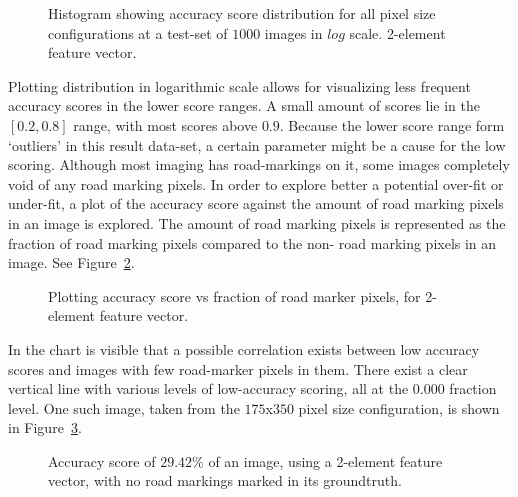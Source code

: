 \begin{figure}[ht]
  \centering
  
  \caption{Histogram showing accuracy score distribution for all pixel size configurations at a test-set of $1000$ images in $log$ scale. 2-element feature vector.
  }\label{fig:xgboost-histogram}
\end{figure}

Plotting distribution in logarithmic scale allows for visualizing less frequent accuracy scores in the lower score ranges. A small amount of scores lie in the $[0.2, 0.8]$ range, with most scores above $0.9$. Because the lower score range form `outliers' in this result data-set, a certain parameter might be a cause for the low scoring. Although most imaging has road-markings on it, some images completely void of any road marking pixels. In order to explore better a potential over-fit or under-fit, a plot of the accuracy score against the amount of road marking pixels in an image is explored. The amount of road marking pixels is represented as the fraction of road marking pixels compared to the non- road marking pixels in an image. See Figure~\ref{fig:xgboost-scatterplot}.

\begin{figure}[ht]
  \centering
  
  \caption{Plotting accuracy score vs fraction of road marker pixels, for 2-element feature vector.
  }\label{fig:xgboost-scatterplot}
\end{figure}

In the chart is visible that a possible correlation exists between low accuracy scores and images with few road-marker pixels in them. There exist a clear vertical line with various levels of low-accuracy scoring, all at the $0.000$ fraction level. One such image, taken from the $175$x$350$ pixel size configuration, is shown in Figure~\ref{fig:xgboost-prediction-dark-gt}. 

\begin{figure}[ht]
  \centering
  
  \caption{Accuracy score of $29.42\%$ of an image, using a 2-element feature vector, with no road markings marked in its groundtruth.
  }\label{fig:xgboost-prediction-dark-gt}
\end{figure}

